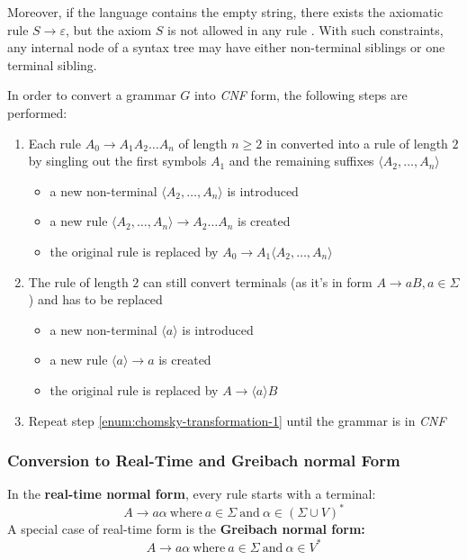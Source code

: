 \documentclass[english]{article}
\begin{document}
Moreover, if the language contains the empty string, there exists the axiomatic rule \(S \rightarrow \varepsilon\), but the axiom \(S\) is not allowed in any rule \RP.
With such constraints, any internal node of a syntax tree may have either non-terminal siblings or one terminal sibling.

In order to convert a grammar \(G\) into \textit{CNF} form, the following steps are performed:

\begin{enumerate}[label=\arabic*., ref=(\arabic*)]
  \item\label{enum:chomsky-transformation-1} Each rule \(A_0 \rightarrow A_1 A_2 \ldots A_n\) of length \(n \geq 2\) in converted into a rule of length \(2\) by singling out the first symbols \(A_1\) and the remaining suffixes \(\langle A_2, \ldots, A_n \rangle\)
  \begin{itemize}
    \item a new non-terminal \(\langle A_2, \ldots, A_n \rangle\) is introduced
    \item a new rule \(\langle A_2, \ldots, A_n \rangle \rightarrow A_2 \ldots A_n\) is created
    \item the original rule is replaced by \(A_0 \rightarrow A_1 \langle A_2, \ldots, A_n \rangle\)
  \end{itemize}
  \item The rule of length \(2\) can still convert terminals (as it's in form \(A \rightarrow aB, a \in \Sigma\)) and has to be replaced
        \begin{itemize}
          \item a new non-terminal \(\langle a \rangle\) is introduced
          \item a new rule \(\langle a \rangle \rightarrow a\) is created
          \item the original rule is replaced by \(A \rightarrow \langle a \rangle B\)
        \end{itemize}
  \item Repeat step \ref{enum:chomsky-transformation-1} until the grammar is in \textit{CNF}
\end{enumerate}

\subsubsection{Conversion to Real-Time and Greibach normal Form}
\label{sec:conversion-to-greibach-and-real-time-normal-form}

In the \textbf{real-time normal form}, every rule starts with a terminal:
\[A \rightarrow a \alpha \ \text{where} \ a \in \Sigma \ \text{and} \ \alpha \in \left( \Sigma \cup V \right)^\ast \]
A special case of real-time form is the \textbf{Greibach normal form:}
\[ A \rightarrow a \alpha \ \text{where} \ a \in \Sigma \ \text{and} \ \alpha \in V^\ast \]
\end{document}
